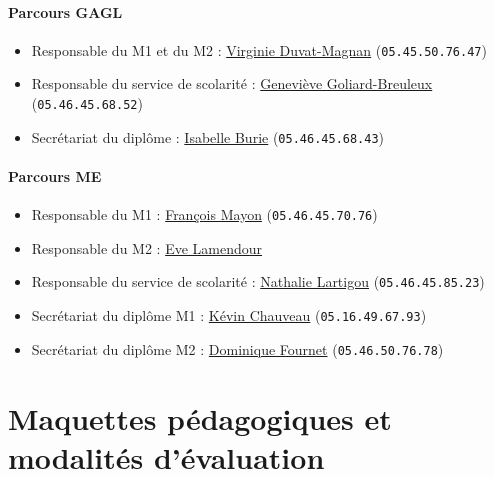 \documentclass[a4paper,11pt]{article}
\begin{document}
\paragraph{Parcours GAGL}

\begin{itemize}
	\item Responsable du M1 et du M2 : \href{mailto:virginie.magnan@univ-lr.fr}{Virginie Duvat-Magnan} (\texttt{05.45.50.76.47})
	\item Responsable du service de scolarité : \href{mailto:genevieve.breuleux@univ-lr.fr}{Geneviève Goliard-Breuleux} (\texttt{05.46.45.68.52})
	\item Secrétariat du diplôme : \href{mailto:isabelle.burie@univ-lr.fr}{Isabelle Burie} (\texttt{05.46.45.68.43})
\end{itemize}

\paragraph{Parcours ME}

\begin{itemize}
	\item Responsable du M1 : \href{mailto:francois.mayon@univ-lr.fr}{François Mayon} (\texttt{05.46.45.70.76})
	\item Responsable du M2 : \href{mailto:eve.lamendour@univ-lr.fr}{Eve Lamendour}
	\item Responsable du service de scolarité : \href{mailto:nathalie.lartigou@univ-lr.fr}{Nathalie Lartigou} (\texttt{05.46.45.85.23})
	\item Secrétariat du diplôme M1 : \href{mailto:kevin.chauveau@univ-lr.fr}{Kévin Chauveau} (\texttt{05.16.49.67.93})
	\item Secrétariat du diplôme M2 : \href{mailto:dominique.fournet@univ-lr.fr}{Dominique Fournet} (\texttt{05.46.50.76.78})
\end{itemize}

\newpage

\section{Maquettes pédagogiques et modalités d'évaluation}\label{Maquette}
\end{document}
